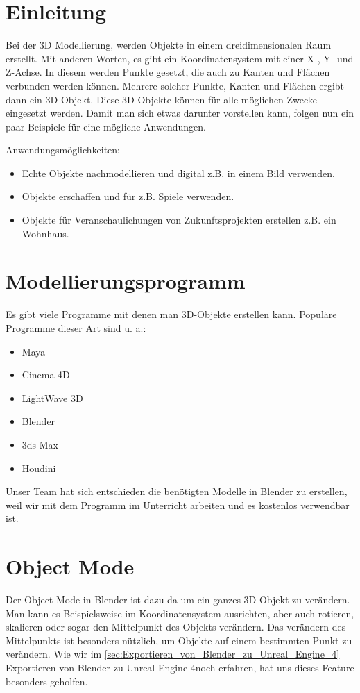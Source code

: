 \section{Einleitung}
Bei der 3D Modellierung, werden Objekte in einem dreidimensionalen Raum erstellt. Mit anderen Worten, es gibt ein Koordinatensystem mit einer X-, Y- und Z-Achse.
In diesem werden Punkte gesetzt, die auch zu Kanten und Flächen verbunden werden können. Mehrere solcher Punkte, Kanten und Flächen ergibt dann ein 3D-Objekt.
Diese 3D-Objekte können für alle möglichen Zwecke eingesetzt werden. Damit man sich etwas darunter vorstellen kann, folgen nun ein paar Beispiele für
eine mögliche Anwendungen.

Anwendungsmöglichkeiten:
\begin{itemize}
    \item Echte Objekte nachmodellieren und digital z.B. in einem Bild verwenden.
    \item Objekte erschaffen und für z.B. Spiele verwenden.
    \item Objekte für Veranschaulichungen von Zukunftsprojekten erstellen z.B. ein Wohnhaus.
\end{itemize}

\section{Modellierungsprogramm}
Es gibt viele Programme mit denen man 3D-Objekte erstellen kann.
\citep{wiki:modellierungsprogramm_beispiele} Populäre Programme dieser Art sind u. a.:

\begin{itemize}
    \item Maya
    \item Cinema 4D
    \item LightWave 3D
    \item Blender
    \item 3ds Max
    \item Houdini
\end{itemize}

Unser Team hat sich entschieden die benötigten Modelle in Blender zu erstellen, weil wir mit dem Programm im Unterricht arbeiten und
es kostenlos verwendbar ist.


\section{Object Mode}
Der Object Mode in Blender ist dazu da um ein ganzes 3D-Objekt zu verändern. Man kann es Beispielsweise im Koordinatensystem ausrichten, aber
auch rotieren, skalieren oder sogar den Mittelpunkt des Objekts verändern. Das verändern des Mittelpunkts ist besonders nützlich, um Objekte auf
einem bestimmten Punkt zu verändern. Wie wir im \autoref{sec:Exportieren_von_Blender_zu_Unreal_Engine_4} \dq  Exportieren von Blender zu Unreal Engine 4\dq noch erfahren, hat uns dieses Feature besonders geholfen.

